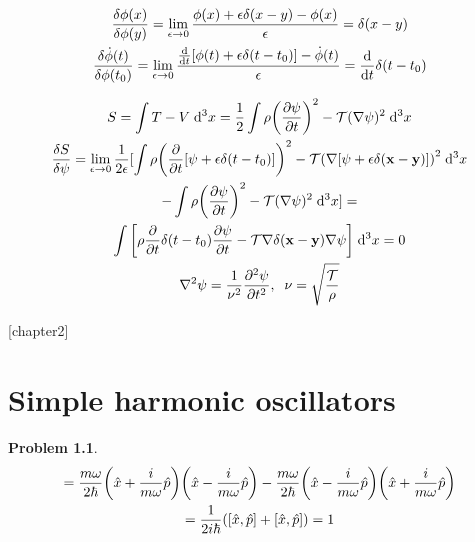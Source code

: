 \documentclass{report}
\theoremstyle{definition}
\begin{document}
\begin{chapter1}\label{prob:4}
	\begin{gather*}
		\fdv{\phi(x)}{\phi(y)} = \lim_{\epsilon \to 0} \frac{\phi(x) + \epsilon\delta(x-y) - \phi(x)}{\epsilon} = \delta(x-y) \\
		\fdv{\dot{\phi}(t)}{\phi(t_0)} = \lim_{\epsilon\to 0} \frac{\dv{t}[\phi(t) + \epsilon\delta(t - t_0)] - \dot{\phi}(t)}{\epsilon} = \dv{t}\delta(t-t_0) 
	\end{gather*}
\end{chapter1}

\begin{chapter1}\label{prob:5}
	\begin{gather*}
		S = \int T - V \;\dd^3{x} = \frac{1}{2}\int \rho\pqty{\pdv{\psi}{t}}^2 - \mathcal{T}(\nabla\psi)^2\;\dd^3{x} \\
		\fdv{S}{\psi} = \lim_{\epsilon \to 0}\frac{1}{2\epsilon}[\int\rho\pqty{\pdv{t}[\psi + \epsilon\delta(t-t_0)]}^2 - \mathcal{T}\pqty{\nabla[\psi + \epsilon\delta({\bf x} - {\bf y})]}^2 \;\dd^3{x} \\ 
		- \int \rho\pqty{\pdv{\psi}{t}}^2 - \mathcal{T}(\nabla\psi)^2\;\dd^3{x}] = \\
		\int\bqty{\rho\pdv{t}\delta(t-t_0)\pdv{\psi}{t} - \mathcal{T}\nabla\delta({\bf x}-{\bf y})\nabla\psi}\;\dd^3{x} = 0 \\
		\nabla^2 \psi = \frac{1}{\nu^2}\pdv[2]{\psi}{t},\;\;\nu = \sqrt{\frac{\cal{T}}{\rho}}    
	\end{gather*}
\end{chapter1}

\begin{chapter1}\label{prob:6}
	
\end{chapter1}

\newtheorem{chapter2}{Problem}
[chapter2]

\chapter{Simple harmonic oscillators}

\begin{chapter2}\label{prob:1}
	\begin{gather*}
		[\hat{a}, \hat{a}^{\dagger}] = \frac{m\omega}{2\hbar}\pqty{\hat{x} + \frac{i}{m\omega}\hat{p}}\pqty{\hat{x} - \frac{i}{m\omega}\hat{p}} - \frac{m\omega}{2\hbar}\pqty{\hat{x} - \frac{i}{m\omega}\hat{p}}\pqty{\hat{x} + \frac{i}{m\omega}\hat{p}} \\ 
		= \frac{1}{2i\hbar}\pqty{[\hat{x},\hat{p}] + [\hat{x},\hat{p}]} = 1
	\end{gather*}
\end{chapter2}
\end{document}
